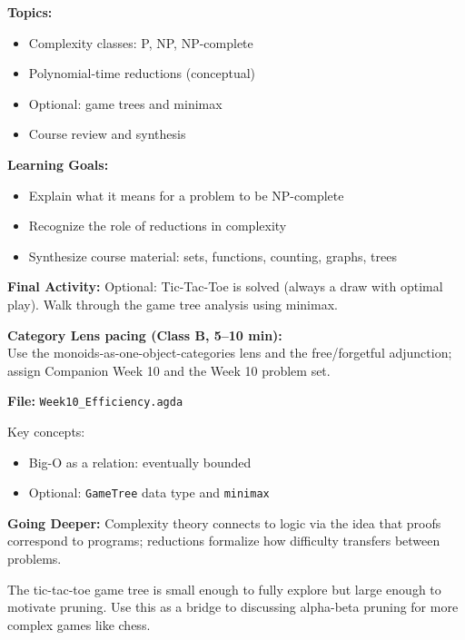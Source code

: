 \documentclass[11pt]{article}
\begin{document}
\begin{classbbox}
\textbf{Topics:}
\begin{itemize}
    \item Complexity classes: P, NP, NP-complete
    \item Polynomial-time reductions (conceptual)
    \item Optional: game trees and minimax
    \item Course review and synthesis
\end{itemize}

\textbf{Learning Goals:}
\begin{itemize}
    \item Explain what it means for a problem to be NP-complete
    \item Recognize the role of reductions in complexity
    \item Synthesize course material: sets, functions, counting, graphs, trees
\end{itemize}

\textbf{Final Activity:} Optional: Tic-Tac-Toe is solved (always a draw with optimal play). Walk through the game tree analysis using minimax.
\end{classbbox}

\textbf{Category Lens pacing (Class B, 5--10 min):}\\
Use the monoids-as-one-object-categories lens and the free/forgetful adjunction; assign Companion Week 10 and the Week 10 problem set.

\begin{agdabox}
\textbf{File:} \texttt{Week10\_Efficiency.agda}

Key concepts:
\begin{itemize}
    \item Big-O as a relation: eventually bounded
    \item Optional: \texttt{GameTree} data type and \texttt{minimax}
\end{itemize}

\textbf{Going Deeper:} Complexity theory connects to logic via the idea that proofs correspond to programs; reductions formalize how difficulty transfers between problems.
\end{agdabox}

\begin{tipbox}
The tic-tac-toe game tree is small enough to fully explore but large enough to motivate pruning. Use this as a bridge to discussing alpha-beta pruning for more complex games like chess.
\end{tipbox}
\end{document}
